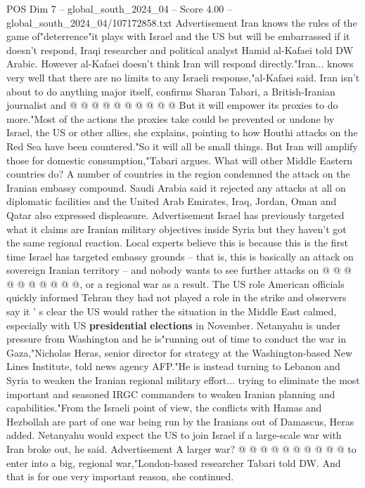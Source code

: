 \begin{textsample}{POS Dim 7 – global\_south\_2024\_04 – Score 4.00 – global\_south\_2024\_04/107172858.txt}
Advertisement Iran knows the rules of the game of"deterrence"it plays with Israel and the US but will be embarrassed if it doesn't respond, Iraqi researcher and political analyst Hamid al-Kafaei told DW Arabic.
However al-Kafaei doesn't think Iran will respond directly."Iran... knows very well that there are no limits to any Israeli response,"al-Kafaei said.
Iran isn't about to do anything major itself, confirms Sharan Tabari, a British-Iranian journalist and @ @ @ @ @ @ @ @ @ @ But it will empower its proxies to do more."Most of the actions the proxies take could be prevented or undone by Israel, the US or other allies, she explains, pointing to how Houthi attacks on the Red Sea have been countered."So it will all be small things.
But Iran will amplify those for domestic consumption,"Tabari argues.
What will other Middle Eastern countries do?
A number of countries in the region condemned the attack on the Iranian embassy compound.
Saudi Arabia said it rejected any attacks at all on diplomatic facilities and the United Arab Emirates, Iraq, Jordan, Oman and Qatar also expressed displeasure.
Advertisement Israel has previously targeted what it claims are Iranian military objectives inside Syria but they haven't got the same regional reaction.
Local experts believe this is because this is the first time Israel has targeted embassy grounds -- that is, this is basically an attack on sovereign Iranian territory -- and nobody wants to see further attacks on @ @ @ @ @ @ @ @ @ @, or a regional war as a result.
The US role American officials quickly informed Tehran they had not played a role in the strike and observers say it ' s clear the US would rather the situation in the Middle East calmed, especially with US \textbf{presidential} \textbf{elections} in November.
Netanyahu is under pressure from Washington and he is"running out of time to conduct the war in Gaza,"Nicholas Heras, senior director for strategy at the Washington-based New Lines Institute, told news agency AFP."He is instead turning to Lebanon and Syria to weaken the Iranian regional military effort... trying to eliminate the most important and seasoned IRGC commanders to weaken Iranian planning and capabilities."From the Israeli point of view, the conflicts with Hamas and Hezbollah are part of one war being run by the Iranians out of Damascus, Heras added.
Netanyahu would expect the US to join Israel if a large-scale war with Iran broke out, he said.
Advertisement A larger war? @ @ @ @ @ @ @ @ @ @ to enter into a big, regional war,"London-based researcher Tabari told DW.
And that is for one very important reason, she continued.

\end{textsample}
